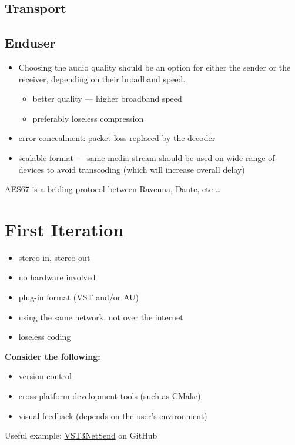 \documentclass[a4paper,12pt]{article}
\begin{document}
{\subsection{Transport}

\subsection{Enduser}
\begin{itemize}
    \item Choosing the audio quality should be an option for either the sender or the receiver, depending on their broadband speed.
    \begin{itemize}
        \item better quality --- higher broadband speed
        \item preferably loseless compression
    \end{itemize}
    \item error concealment: packet loss replaced by the decoder
    \item scalable format --- same media stream should be used on wide range of devices to avoid transcoding (which will increase overall delay)
\end{itemize}
AES67 is a briding protocol between Ravenna, Dante, etc \ldots

\section{First Iteration}
\begin{itemize}
    \item stereo in, stereo out
    \item no hardware involved
    \item plug-in format (VST and/or AU)
    \item using the same network, not over the internet
    \item loseless coding
\end{itemize}

\noindent
\textbf{Consider the following:}
\begin{itemize}
    \item version control
    \item cross-platform development tools (such as \href{https://cmake.org/}{CMake})
    \item visual feedback (depends on the user's environment)
\end{itemize}
Useful example: \href{https://github.com/vgorloff/VST3NetSend}{VST3NetSend} on GitHub
}
\end{document}
